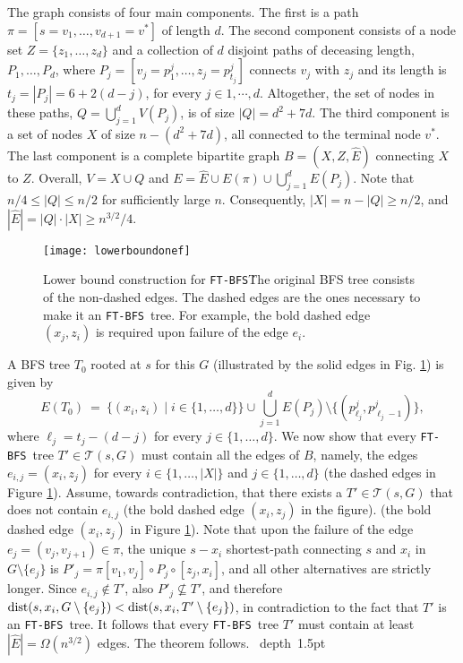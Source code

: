 \documentclass[12pt]{article}
\newcommand{\dist}{\mbox{\rm dist}}
\def\blackslug{\hbox{\hskip 1pt \vrule width 4pt height 8pt
    depth 1.5pt \hskip 1pt}}
\def\QED{\quad\blackslug\lower 8.5pt\null\par}
\def\FTBFS{\mbox{\tt FT-BFS}}
\begin{document}
The graph consists of four main components.
The first is a path $\pi=[s=v_1, \ldots, v_{d+1}=v^*]$ of length $d$.
The second component consists of a node set $Z=\{z_1,\ldots,z_d\}$
and a collection of $d$ disjoint paths of deceasing length, $P_1, \ldots, P_d$,
where $P_j=[v_j=p^j_1, \ldots, z_j=p^j_{t_j}]$ connects $v_j$ with $z_j$ and its length is $t_{j}=|P_j|=6+2(d-j)$, for every $j \in 1,\cdots,d$.
Altogether, the set of nodes in these paths, $Q=\bigcup_{j=1}^d V(P_j)$,
is of size $|Q| = d^2+7d$.
The third component is a set of nodes $X$ of size $n-(d^2+7d)$,
all connected to the terminal node $v^*$.
The last component is a complete bipartite graph $B=(X, Z, \hat{E})$
connecting $X$ to $Z$.
Overall, $V=X \cup Q$ and $E= \hat{E} \cup E(\pi) \cup \bigcup_{j=1}^d E(P_j)$.
Note that $n/4 \le |Q| \le n/2$ for sufficiently large $n$. Consequently,
$|X| = n- |Q| \ge n/2$, and $|\hat{E}| = |Q|\cdot |X| \ge n^{3/2}/4$.

\begin{figure}[htb!]
\begin{center}
\texttt{[image: lowerboundonef]}
\caption{Lower bound construction for \FTBFS\.
The original BFS tree consists of the non-dashed edges.
The dashed edges are the ones necessary to make it an \FTBFS\ tree.
For example, the bold dashed edge $(x_j, z_i)$ is required
upon failure of the edge $e_i$. \label{fig:lowerbound1f}}
\end{center}
\end{figure}

A BFS tree $T_0$ rooted at $s$ for this $G$
(illustrated by the solid edges in Fig. \ref{fig:lowerbound1f})
is given by
$$E(T_0) ~=~ \{(x_i, z_i) \mid i \in \{1,\ldots, d\}\} \cup
\bigcup_{j=1}^d E(P_j) \setminus \{(p^j_{\ell_j}, p^j_{\ell_j-1})\},$$
where $\ell_j=t_j-(d-j)$ for every $j \in \{1, \ldots, d\}$.
We now show that every \FTBFS\ tree $T' \in \mathcal{T}(s,G)$ must contain
all the edges of $B$, namely, the edges $e_{i,j}=(x_i, z_j)$
for every $i \in \{1, \ldots, |X| \}$ and $j \in \{1, \ldots, d\}$
(the dashed edges in Figure \ref{fig:lowerbound1f}).
Assume, towards contradiction, that there exists
a $T' \in \mathcal{T}(s,G)$ that does not contain $e_{i,j}$
(the bold dashed edge $(x_i, z_j)$ in the figure).
(the bold dashed edge $(x_i, z_j)$ in Figure \ref{fig:lowerbound1f}).
Note that upon the failure of the edge $e_j=(v_j,v_{j+1}) \in \pi$,
the unique $s-x_i$ shortest-path connecting $s$ and $x_i$ in
$G \setminus \{e_j\}$ is $P'_{j}= \pi[v_1,v_j] \circ P_{j}\circ [z_{j}, x_i]$,
and all other alternatives are strictly longer.
Since $e_{i,j} \notin T'$, also $P'_j \nsubseteq T'$, and therefore
$\dist(s, x_i, G \setminus \{e_j\})< \dist(s, x_i, T' \setminus \{e_j\})$,
in contradiction to the fact that $T'$ is an \FTBFS\ tree.
It follows that every \FTBFS\ tree $T'$ must contain at least
$|\hat{E}| = \Omega(n^{3/2})$ edges. The theorem follows.
\QED
\end{document}
